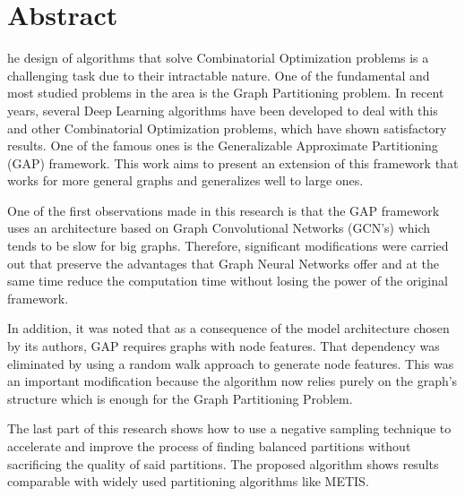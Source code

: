 

\chapter*{Abstract}

he design of algorithms that solve Combinatorial Optimization problems is a challenging task due to their intractable nature. One of the fundamental and most studied problems in the area is the Graph Partitioning problem. In recent years, several Deep Learning algorithms have been developed to deal with this and other Combinatorial Optimization problems, which have shown satisfactory results. One of the famous ones is the Generalizable Approximate Partitioning (GAP) framework. This work aims to present an extension of this framework that works for more general graphs and generalizes well to large ones.

One of the first observations made in this research is that the GAP framework uses an architecture based on Graph Convolutional Networks (GCN's) which tends to be slow for big graphs. Therefore, significant modifications were carried out that preserve the advantages that Graph Neural Networks offer and at the same time reduce the computation time without losing the power of the original framework.

In addition, it was noted that as a consequence of the model architecture chosen by its authors, GAP requires graphs with node features. That dependency was eliminated by using a random walk approach to generate node features. This was an important modification because the algorithm now relies purely on the graph's structure which is enough for the Graph Partitioning Problem.

The last part of this research shows how to use a negative sampling technique to accelerate and improve the process of finding balanced partitions without sacrificing the quality of said partitions. The proposed algorithm shows results comparable with widely used partitioning algorithms like METIS.

\clearpage